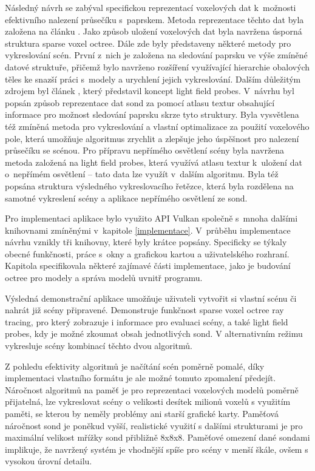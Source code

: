 Následný návrh se zabýval specifickou reprezentací voxelových dat k~možnosti efektivního nalezení průsečíku s~paprskem. Metoda reprezentace těchto dat byla založena na článku \cite{Laine2011EfficientSV}. Jako způsob uložení voxelových dat byla navržena úsporná struktura sparse voxel octree. Dále zde byly představeny některé metody pro vykreslování scén. První z~nich je založena na sledování paprsku ve výše zmíněné datové struktuře, přičemž bylo navrženo rozšíření využívající hierarchie obalových těles ke snazší práci s~modely a urychlení jejich vykreslování. Dalším důležitým zdrojem byl článek \cite{light_field_probes}, který představil koncept light field probes. V~návrhu byl popsán způsob reprezentace dat sond za pomocí atlasu textur obsahující informace pro možnost sledování paprsku skrze tyto struktury. Byla vysvětlena též zmíněná metoda pro vykreslování a vlastní optimalizace za použití voxelového pole, která umožňuje algoritmus zrychlit a zlepšuje jeho úspěšnost pro nalezení průsečíku se scénou. Pro přípravu nepřímého osvětlení scény byla navržena metoda založená na light field probes, která využívá atlasu textur k~uložení dat o~nepřímém osvětlení -- tato data lze využít v~dalším algoritmu. Byla též popsána struktura výsledného vykreslovacího řetězce, která byla rozdělena na samotné vykreslení scény a aplikace nepřímého osvětlení ze sond.

Pro implementaci aplikace bylo využito API Vulkan společně s~mnoha dalšími knihovnami zmíněnými v~kapitole \ref{implementace}. V~průběhu implementace návrhu vznikly tři knihovny, které byly krátce popsány. Specificky se týkaly obecné funkčnosti, práce s~okny a grafickou kartou a uživatelského rozhraní. Kapitola specifikovala některé zajímavé části implementace, jako je budování octree pro modely a správa modelů uvnitř programu.

Výsledná demonstrační aplikace umožňuje uživateli vytvořit si vlastní scénu či nahrát již scény připravené. Demonstruje funkčnost sparse voxel octree ray tracing, pro který zobrazuje i informace pro evaluaci scény, a také light field probes, kdy je možné zkoumat obsah jednotlivých sond. V alternativním režimu vykresluje scény kombinací těchto dvou algoritmů.

Z pohledu efektivity algoritmů je načítání scén poměrně pomalé, díky implementaci vlastního formátu je ale možné tomuto zpomalení předejít. Náročnost algoritmů na paměť je pro reprezentaci voxelových modelů poměrně přijatelná, lze vykreslovat scény o velikosti desítek milionů voxelů s využitím paměti, se kterou by neměly problémy ani starší grafické karty. Paměťová náročnost sond je poněkud vyšší, realistické využití s dalšími strukturami je pro maximální velikost mřížky sond přibližně 8x8x8. Paměťové omezení dané sondami implikuje, že navržený systém je vhodnější spíše pro scény v menší škále, ovšem s vysokou úrovní detailu.

